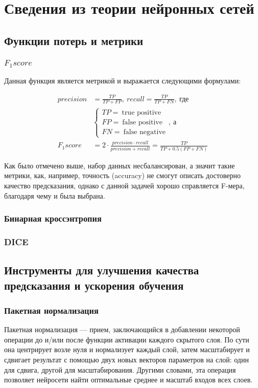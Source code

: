 \chapter{Сведения из теории нейронных сетей}

\section{Функции потерь и метрики}
\subsection{$F_1score$}
Данная функция является метрикой и выражается следующими формулами:

\begin{align*}
    precision &= \frac{TP}{TP + FP}, \: recall = \frac{TP}{TP + FN}, \: \text{где} \\
    &\begin{cases}
        TP = \: \text{true positive} \\
        FP = \: \text{false positive} \\
        FN = \: \text{false negative}
    \end{cases}, \: \text{а} \\
    F_1score &= 2 \cdot \frac{precision \cdot recall}{precision + recall} = \frac{TP}{TP + 0.5(FP + FN)}
\end{align*}

Как было отмечено выше, набор данных несбалансирован, а значит такие метрики, как,
например, точность (accuracy) не смогут описать достоверно качество
предсказания, однако с данной задачей хорошо справляется F-мера, благодаря чему
и была выбрана.

\subsection{Бинарная кроссэнтропия}

\subsection{DICE}

\section{Инструменты для улучшения качества предсказания и ускорения обучения}

\subsection{Пакетная нормализация}
Пакетная нормализация --- прием, заключающийся в добавлении некоторой операции
до и/или после функции активации каждого скрытого слоя. По сути она центрирует
возле нуля и нормализует каждый слой, затем масштабирует и сдвигает результат с
помощью двух новых векторов параметров на слой: один для сдвига, другой для
масштабирования. Другими словами, эта операция позволяет нейросети найти
оптимальные среднее и масштаб входов всех слоев.


